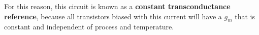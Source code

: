 For this reason, this circuit is known as a \textbf{constant transconductance reference}, because all transistors biased with this current will have a $g_m$ that is constant and independent of process and temperature.
